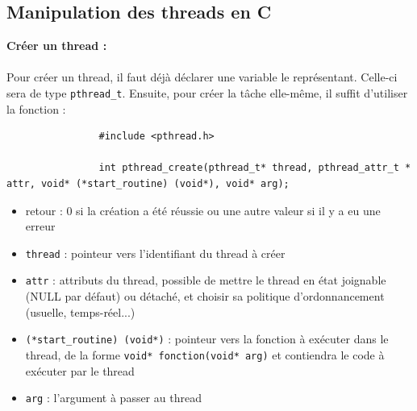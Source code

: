 	\subsection{Manipulation des threads en C}
		\begin{frame}[containsverbatim]
			\textbf{Créer un thread :}
			\\~\\
			Pour créer un thread, il faut déjà déclarer une variable le représentant. Celle-ci sera de type \lstinline!pthread_t!. Ensuite, pour créer la tâche elle-même, il suffit d'utiliser la fonction :
			\begin{lstlisting}
				#include <pthread.h>

				int pthread_create(pthread_t* thread, pthread_attr_t * attr, void* (*start_routine) (void*), void* arg);
			\end{lstlisting}
			\begin{itemize}
				\item retour : 0 si la création a été réussie ou une autre valeur si il y a eu une erreur
				\item \lstinline!thread! : pointeur vers l'identifiant du thread à créer
				\item \lstinline!attr! : attributs du thread, possible de mettre le thread en état joignable (NULL par défaut) ou détaché, et choisir sa politique d'ordonnancement (usuelle, temps-réel...)
				\item \lstinline!(*start_routine) (void*)! : pointeur vers la fonction à exécuter dans le thread, de la forme \lstinline!void* fonction(void* arg)! et contiendra le code à exécuter par le thread
				\item \lstinline!arg! : l'argument à passer au thread
			\end{itemize}
		\end{frame}
		
